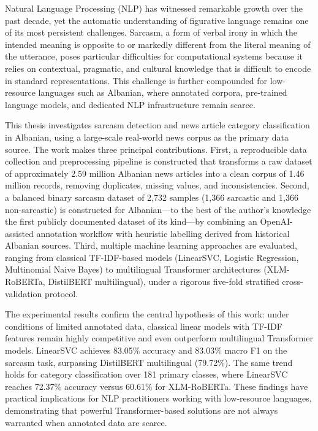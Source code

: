 \documentclass[12pt,a4paper]{article}
\begin{document}
Natural Language Processing (NLP) has witnessed remarkable growth over the past decade, yet the automatic understanding of figurative language remains one of its most persistent challenges. Sarcasm, a form of verbal irony in which the intended meaning is opposite to or markedly different from the literal meaning of the utterance, poses particular difficulties for computational systems because it relies on contextual, pragmatic, and cultural knowledge that is difficult to encode in standard representations. This challenge is further compounded for low-resource languages such as Albanian, where annotated corpora, pre-trained language models, and dedicated NLP infrastructure remain scarce.

This thesis investigates sarcasm detection and news article category classification in Albanian, using a large-scale real-world news corpus as the primary data source. The work makes three principal contributions. First, a reproducible data collection and preprocessing pipeline is constructed that transforms a raw dataset of approximately 2.59 million Albanian news articles into a clean corpus of 1.46 million records, removing duplicates, missing values, and inconsistencies. Second, a balanced binary sarcasm dataset of 2,732 samples (1,366 sarcastic and 1,366 non-sarcastic) is constructed for Albanian---to the best of the author's knowledge the first publicly documented dataset of its kind---by combining an OpenAI-assisted annotation workflow with heuristic labelling derived from historical Albanian sources. Third, multiple machine learning approaches are evaluated, ranging from classical TF-IDF-based models (LinearSVC, Logistic Regression, Multinomial Naive Bayes) to multilingual Transformer architectures (XLM-RoBERTa, DistilBERT multilingual), under a rigorous five-fold stratified cross-validation protocol.

The experimental results confirm the central hypothesis of this work: under conditions of limited annotated data, classical linear models with TF-IDF features remain highly competitive and even outperform multilingual Transformer models. LinearSVC achieves 83.05\% accuracy and 83.03\% macro F1 on the sarcasm task, surpassing DistilBERT multilingual (79.72\%). The same trend holds for category classification over 181 primary classes, where LinearSVC reaches 72.37\% accuracy versus 60.61\% for XLM-RoBERTa. These findings have practical implications for NLP practitioners working with low-resource languages, demonstrating that powerful Transformer-based solutions are not always warranted when annotated data are scarce.
\end{document}
